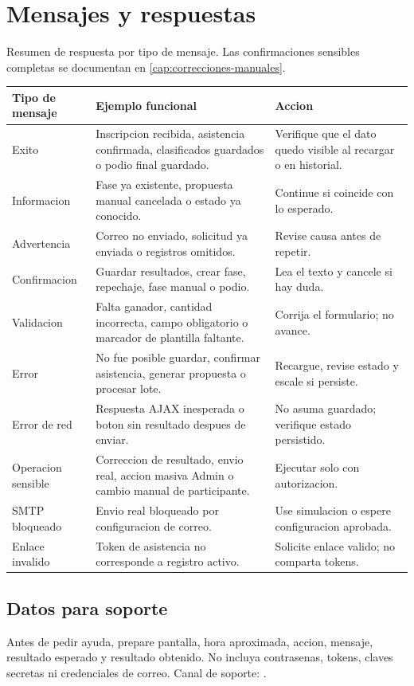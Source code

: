 \chapter{Mensajes y respuestas}
\label{anexo:mensajes-respuestas}

Resumen de respuesta por tipo de mensaje. Las confirmaciones sensibles completas se documentan en \cref{cap:correcciones-manuales}.

\begin{longtable}{p{3.4cm}p{5.6cm}p{5.4cm}}
\toprule
Tipo de mensaje & Ejemplo funcional & Accion\\
\midrule
\endhead
Exito & Inscripcion recibida, asistencia confirmada, clasificados guardados o podio final guardado. & Verifique que el dato quedo visible al recargar o en historial.\\
Informacion & Fase ya existente, propuesta manual cancelada o estado ya conocido. & Continue si coincide con lo esperado.\\
Advertencia & Correo no enviado, solicitud ya enviada o registros omitidos. & Revise causa antes de repetir.\\
Confirmacion & Guardar resultados, crear fase, repechaje, fase manual o podio. & Lea el texto y cancele si hay duda.\\
Validacion & Falta ganador, cantidad incorrecta, campo obligatorio o marcador de plantilla faltante. & Corrija el formulario; no avance.\\
Error & No fue posible guardar, confirmar asistencia, generar propuesta o procesar lote. & Recargue, revise estado y escale si persiste.\\
Error de red & Respuesta AJAX inesperada o boton sin resultado despues de enviar. & No asuma guardado; verifique estado persistido.\\
Operacion sensible & Correccion de resultado, envio real, accion masiva Admin o cambio manual de participante. & Ejecutar solo con autorizacion.\\
SMTP bloqueado & Envio real bloqueado por configuracion de correo. & Use simulacion o espere configuracion aprobada.\\
Enlace invalido & Token de asistencia no corresponde a registro activo. & Solicite enlace valido; no comparta tokens.\\
\bottomrule
\end{longtable}

\section{Datos para soporte}

Antes de pedir ayuda, prepare pantalla, hora aproximada, accion, mensaje, resultado esperado y resultado obtenido. No incluya contrasenas, tokens, claves secretas ni credenciales de correo. Canal de soporte: .
